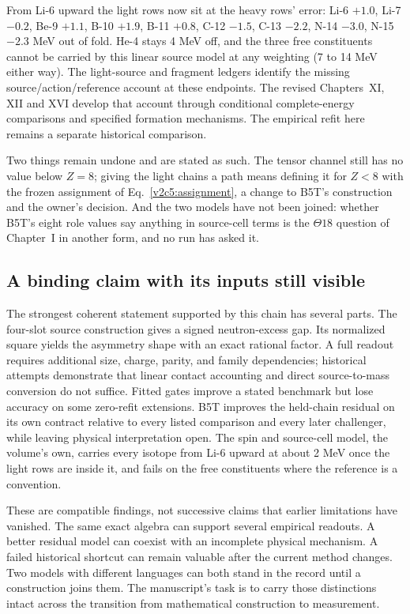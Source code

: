 From Li-6 upward the light rows now sit at the heavy rows' error: Li-6 $+1.0$, Li-7 $-0.2$, Be-9 $+1.1$, B-10 $+1.9$, B-11 $+0.8$, C-12 $-1.5$, C-13 $-2.2$, N-14 $-3.0$, N-15 $-2.3$ MeV out of fold. He-4 stays 4 MeV off, and the three free constituents cannot be carried by this linear source model at any weighting (7 to 14 MeV either way). The light-source and fragment ledgers identify the missing source/action/reference account at these endpoints. The revised Chapters~XI, XII and XVI develop that account through conditional complete-energy comparisons and specified formation mechanisms. The empirical refit here remains a separate historical comparison.

Two things remain undone and are stated as such. The tensor channel still has no value below $Z=8$; giving the light chains a path means defining it for $Z<8$ with the frozen assignment of Eq.~\eqref{v2c5:assignment}, a change to B5T's construction and the owner's decision. And the two models have not been joined: whether B5T's eight role values say anything in source-cell terms is the $\Theta18$ question of Chapter~I in another form, and no run has asked it.

\subsection{A binding claim with its inputs still visible}
\label{v2c5:conclusion}

The strongest coherent statement supported by this chain has several parts. The four-slot source construction gives a signed neutron-excess gap. Its normalized square yields the asymmetry shape with an exact rational factor. A full readout requires additional size, charge, parity, and family dependencies; historical attempts demonstrate that linear contact accounting and direct source-to-mass conversion do not suffice. Fitted gates improve a stated benchmark but lose accuracy on some zero-refit extensions. B5T improves the held-chain residual on its own contract relative to every listed comparison and every later challenger, while leaving physical interpretation open. The spin and source-cell model, the volume's own, carries every isotope from Li-6 upward at about 2 MeV once the light rows are inside it, and fails on the free constituents where the reference is a convention.

These are compatible findings, not successive claims that earlier limitations have vanished. The same exact algebra can support several empirical readouts. A better residual model can coexist with an incomplete physical mechanism. A failed historical shortcut can remain valuable after the current method changes. Two models with different languages can both stand in the record until a construction joins them. The manuscript's task is to carry those distinctions intact across the transition from mathematical construction to measurement.

